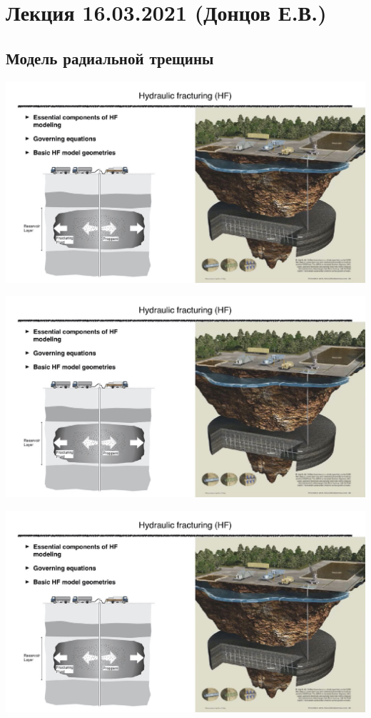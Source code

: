 \documentclass[main.tex]{subfiles}
\begin{document}

\section{Лекция 16.03.2021 (Донцов Е.В.)}

\subsection{Модель радиальной трещины}

\includegraphics[width=\textwidth, page=49]{HF_slides.pdf}

\includegraphics[width=\textwidth, page=50]{HF_slides.pdf}

\includegraphics[width=\textwidth, page=51]{HF_slides.pdf}
\end{document}

